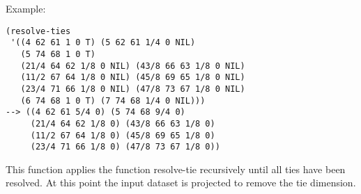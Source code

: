 \vspace{0.5cm}
\noindent Example:
\begin{verbatim}
(resolve-ties
 '((4 62 61 1 0 T) (5 62 61 1/4 0 NIL)
   (5 74 68 1 0 T)
   (21/4 64 62 1/8 0 NIL) (43/8 66 63 1/8 0 NIL)
   (11/2 67 64 1/8 0 NIL) (45/8 69 65 1/8 0 NIL)
   (23/4 71 66 1/8 0 NIL) (47/8 73 67 1/8 0 NIL)
   (6 74 68 1 0 T) (7 74 68 1/4 0 NIL)))
--> ((4 62 61 5/4 0) (5 74 68 9/4 0)
     (21/4 64 62 1/8 0) (43/8 66 63 1/8 0)
     (11/2 67 64 1/8 0) (45/8 69 65 1/8 0)
     (23/4 71 66 1/8 0) (47/8 73 67 1/8 0))
\end{verbatim}

\noindent This function applies the function
resolve-tie recursively until all ties have been
resolved. At this point the input dataset is projected
to remove the tie dimension.












